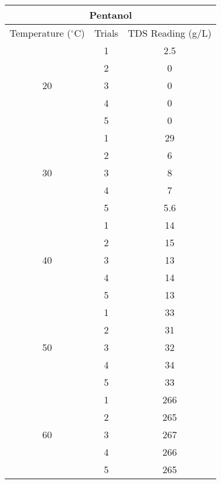 

\begin{table}[H]
  \centering
    \begin{tabular}{ccc}
    \toprule
    \multicolumn{3}{c}{Pentanol} \\
    \midrule
    Temperature ($^\circ$C) & Trials & TDS Reading (g/L)  \\
    \midrule
    \multirow{5}[10]{*}{20} & 1     & 2.5 \\
\cmidrule{2-3}          & 2     & 0 \\
\cmidrule{2-3}          & 3     & 0 \\
\cmidrule{2-3}          & 4     & 0 \\
\cmidrule{2-3}          & 5     & 0 \\
    \midrule
    \multirow{5}[10]{*}{30} & 1     & 29 \\
\cmidrule{2-3}          & 2     & 6 \\
\cmidrule{2-3}          & 3     & 8 \\
\cmidrule{2-3}          & 4     & 7 \\
\cmidrule{2-3}          & 5     & 5.6 \\
    \midrule
    \multirow{5}[10]{*}{40} & 1     & 14 \\
\cmidrule{2-3}          & 2     & 15 \\
\cmidrule{2-3}          & 3     & 13 \\
\cmidrule{2-3}          & 4     & 14 \\
\cmidrule{2-3}          & 5     & 13 \\
    \midrule
    \multirow{5}[10]{*}{50} & 1     & 33 \\
\cmidrule{2-3}          & 2     & 31 \\
\cmidrule{2-3}          & 3     & 32 \\
\cmidrule{2-3}          & 4     & 34 \\
\cmidrule{2-3}          & 5     & 33 \\
    \midrule
    \multirow{5}[10]{*}{60} & 1     & 266 \\
\cmidrule{2-3}          & 2     & 265 \\
\cmidrule{2-3}          & 3     & 267 \\
\cmidrule{2-3}          & 4     & 266 \\
\cmidrule{2-3}          & 5     & 265 \\
    \bottomrule
    \end{tabular}%
  \label{tab:addlabel}%
\end{table}%

